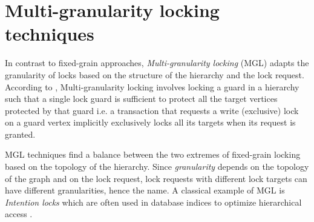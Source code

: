





\section{Multi-granularity locking techniques}

In contrast to fixed-grain approaches, \emph{Multi-granularity locking} (MGL) \cite{gray1975granularity} adapts the granularity of locks based on the structure of the hierarchy and the lock request. 
According to \citet{gray1975granularity}, Multi-granularity locking involves locking a guard in a hierarchy such that a single lock guard is sufficient to protect all the target vertices protected by that guard i.e. a transaction that requests a write (exclusive) lock on a guard vertex implicitly exclusively locks all its targets when its request is granted. 



 MGL techniques find a balance between the two extremes of fixed-grain locking based on the topology of the hierarchy.
Since \emph{granularity} depends on the topology of the graph and on the lock request, lock requests with different lock targets can have different granularities, hence the name. A classical example of MGL is \emph{Intention locks} \cite{StonebrakerGranularity} which are often used in database indices to optimize hierarchical access \cite{sqlintentionlocks}. 

